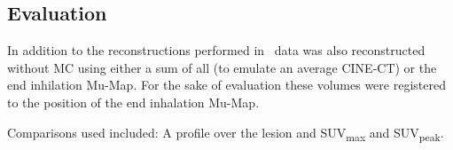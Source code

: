    \vspace{-0.3cm}
    
    \subsection{Evaluation} \label{sec:evaluation}
        In addition to the reconstructions performed in~ data was also reconstructed without \gls{MC} using either a sum of all  (to emulate an average CINE-CT) or the end inhilation \gls{Mu-Map}. For the sake of evaluation these volumes were registered to the position of the end inhalation \gls{Mu-Map}.
        
        Comparisons used included: A profile over the lesion and \gls{SUV}\textsubscript{max} and \gls{SUV}\textsubscript{peak}.%

\vspace{-0.3cm}

